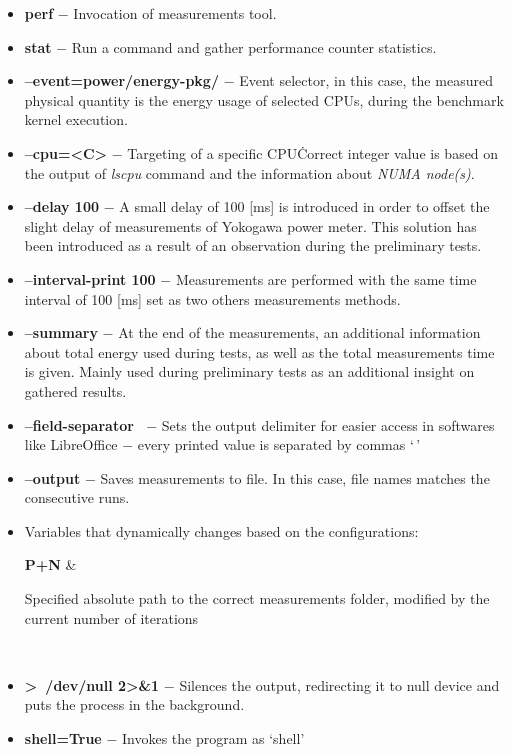 \begin{itemize}
    \item \textbf{perf} $-$ Invocation of measurements tool.
    \item \textbf{stat} $-$ Run a command and gather performance counter
    statistics.
    \item \textbf{--event=power/energy-pkg/} $-$ Event selector, in this case,
    the measured physical quantity is the energy usage of selected CPUs,
    during the benchmark kernel execution.
    \item \textbf{--cpu=<C>} $-$ Targeting of a specific CPU\. Correct integer
    value is based on the output of \emph{lscpu} command and the information
    about \emph{NUMA node\@(s)}.
    \item \textbf{--delay 100} $-$ A small delay of 100 [ms] is introduced in
    order to offset the slight delay of measurements of Yokogawa power meter.
    This solution has been introduced as a result of an observation during the
    preliminary tests. 
    \item \textbf{--interval-print 100} $-$ Measurements are performed with
    the same time interval of 100 [ms] set as two others measurements methods.
    \item \textbf{--summary} $-$ At the end of the measurements, an additional
    information about total energy used during tests, as well as the total
    measurements time is given. Mainly used during preliminary tests as an
    additional insight on gathered results.
    \item \textbf{--field-separator \,} $-$ Sets the output delimiter for
    easier access in softwares like LibreOffice $-$ every printed value is
    separated by commas `\,'
    \item \textbf{--output} $-$ Saves measurements to file. In this case,
    file names matches the consecutive runs.
    \item Variables that dynamically changes based on the configurations:
    \begin{conditions}
        \textbf{P+N} & \parbox[t]{12cm}{Specified absolute path to
        the correct measurements folder, modified by the current number of
        iterations} \\
    \end{conditions}
    \item \textbf{\textgreater~/dev/null 2\textgreater\&1} $-$
    Silences the output, redirecting it to null device and puts the process
    in the background.
    \item \textbf{shell=True} $-$ Invokes the program as `shell'
\end{itemize}

